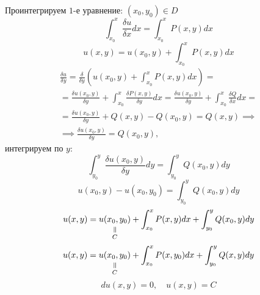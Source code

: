 \documentclass[11pt,a4paper,oneside]{report}
\newcommand{\verteq}[0]{\rotatebox{90}{$=$}}
\newcommand{\equalto}[2]{\underset{\scriptstyle\overset{\mkern4mu\verteq}{#2}}{#1}}
\theoremstyle{definition}
\theoremstyle{plain}
\theoremstyle{remark}
\begin{document}
Проинтегрируем $1$-е уравнение: $(x_0,y_0) \in D$
\begin{equation*}
    \int_{x_0}^{x}\frac{\delta u}{\delta x}dx = \int_{x_0}^{x}P(x,y)dx
\end{equation*}
\begin{equation}\label{eq15}
    u(x,y) = u(x_0,y) + \int_{x_0}^{x}P(x,y)dx
\end{equation}
\begin{multline*}
    \frac{\delta u}{\delta y} = \frac{\delta}{\delta y}(u(x_0,y) + \int_{x_0}^{x}P(x,y)dx) = \\
    = \frac{\delta u(x_0,y)}{\delta y} + \int_{x_0}^{x}\frac{\delta P(x,y)}{\delta y}dx = \frac{\delta u(x_0,y)}{\delta y} + \int_{x_0}^{x}\frac{\delta Q}{\delta x}dx = \\
    = \frac{\delta u(x_0,y)}{\delta y} + Q(x,y) - Q(x_0,y) = Q(x,y) \implies \\
    \implies \frac{\delta u(x_0,y)}{\delta y} = Q(x_0,y),
\end{multline*}
интегрируем по $y$:
\begin{equation*}
    \int_{y_0}^{y}\frac{\delta u(x_0,y)}{\delta y}dy = \int_{y_0}^{y}Q(x_0,y)dy
\end{equation*}
\begin{equation*}
    u(x_0,y) - u(x_0,y_0) = \int_{y_0}^{y}Q(x_0,y)dy
\end{equation*}
\begin{equation}\label{eq16}
    u(x,y) = \equalto{u(x_0,y_0)}{C} + \int_{x_0}^{x}P(x,y)dx + \int_{y_0}^{y}Q(x_0,y)dy
\end{equation}
\begin{equation}\label{eq17}
    u(x,y) = \equalto{u(x_0,y_0)}{C} + \int_{x_0}^{x}P(x,y_0)dx + \int_{y_0}^{y}Q(x,y)dy
\end{equation}
\begin{equation*}
    du(x,y) = 0, \quad u(x,y) = C
\end{equation*}
\end{document}
